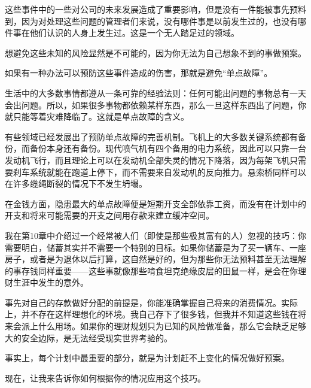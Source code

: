 这些事件中的一些对公司的未来发展造成了重要影响，但是没有一件能被事先预料到，因为对处理这些问题的管理者们来说，没有哪件事是以前发生过的，也没有哪件事在他们认识的人身上发生过。这是一个无人踏足过的领域。

想避免这些未知的风险显然是不可能的，因为你无法为自己想象不到的事做预案。

如果有一种办法可以预防这些事件造成的伤害，那就是避免“单点故障”。

生活中的大多数事情都遵从一条可靠的经验法则：任何可能出问题的事物总有一天会出问题。所以，如果很多事物都依赖某样东西，那么一旦这样东西出了问题，你就只能等着灾难降临了。这就是单点故障的含义。

有些领域已经发展出了预防单点故障的完善机制。飞机上的大多数关键系统都有备份，而备份本身还有备份。现代喷气机有四个备用的电力系统，因此可以只靠一台发动机飞行，而且理论上可以在发动机全部失灵的情况下降落，因为每架飞机只需要刹车系统就能在跑道上停下，而不需要来自发动机的反向推力。悬索桥同样可以在许多缆绳断裂的情况下不发生坍塌。

在金钱方面，隐患最大的单点故障便是短期开支全部依靠工资，而没有在计划中的开支和将来可能需要的开支之间用存款来建立缓冲空间。

我在第10章中介绍过一个经常被人们（即使是那些极其富有的人）忽视的技巧：你需要明白，储蓄其实并不需要一个特别的目标。如果你储蓄是为了买一辆车、一座房子，或者是为退休以后打算，这自然是好的，但为那些你无法预料甚至无法理解的事存钱同样重要——这些事就像那些啃食坦克绝缘皮层的田鼠一样，是会在你理财生涯中发生的意外。

事先对自己的存款做好分配的前提是，你能准确掌握自己将来的消费情况。实际上，并不存在这样理想化的环境。我自己存下了很多钱，但我并不知道这些钱在将来会派上什么用场。如果你的理财规划只为已知的风险做准备，那么它会缺乏足够大的安全边际，是无法经受现实世界考验的。

事实上，每个计划中最重要的部分，就是为计划赶不上变化的情况做好预案。

现在，让我来告诉你如何根据你的情况应用这个技巧。
